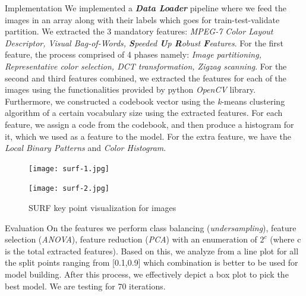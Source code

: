 \documentclass[final]{beamer}
\newlength{\colwidth}
\begin{document}
\begin{frame}[t]
\begin{columns}[t]
\begin{column}{\colwidth}
\begin{block}{Implementation}
    We implemented a \textit{\textbf{Data Loader}} pipeline where we feed the images in an array along with their labels which goes for train-test-validate partition. We extracted the 3 mandatory features: \textit{MPEG-7 Color Layout Descriptor, Visual Bag-of-Words, \textbf{S}peeded \textbf{U}p \textbf{R}obust \textbf{F}eatures}. For the first feature, the process comprised of 4 phases namely: \textit{Image partitioning, Representative color selection, DCT transformation, Zigzag scanning}. For the second and third features combined, we extracted the features for each of the images using the functionalities provided by python \textit{OpenCV} library. Furthermore, we constructed a codebook vector using the \textit{k}-means clustering algorithm of a certain vocabulary size using the extracted features. For each feature, we assign a code from the codebook, and then produce a histogram for it, which we used as a feature to the model. For the extra  feature, we have the \textit{Local Binary Patterns} and \textit{Color Histogram}.
    
    \begin{figure}[ht]
    \begin{minipage}[b]{.40\textwidth}
    \centering
    \texttt{[image: surf-1.jpg]}
    \label{fig:keyp-1}
    \end{minipage}\qquad
    \begin{minipage}[b]{.40\textwidth}
    \centering
    \texttt{[image: surf-2.jpg]}
    \label{fig:keyp-2}
    \end{minipage}
    \caption{SURF key point visualization for images}
    \end{figure} 


  \end{block}

  \begin{block}{Evaluation}
    On the features we perform class balancing (\textit{undersampling}), feature selection (\textit{ANOVA}), feature reduction (\textit{PCA}) with an enumeration of \textbf{$2^c$} (where c is the total extracted features). Based on this, we analyze from a line plot for all the split points ranging from [0.1,0.9] which combination is better to be used for model building. After this process, we effectively depict a box plot to pick the best model. We are testing for 70 iterations. 
  \end{block}


\end{column}
\end{columns}
\end{frame}
\end{document}
